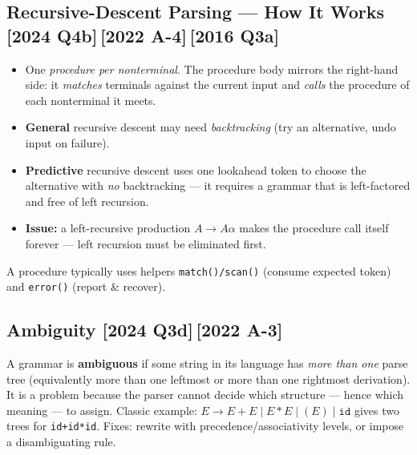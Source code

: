 \documentclass[12pt, a4paper]{article}
\newenvironment{qbox}{\begin{mdframed}[style=qframe]}{\end{mdframed}}
\newcommand{\yr}[1]{{\small\color{accent}\textbf{[#1]}}}
\newcommand{\term}[1]{\textbf{\color{keyblue}#1}}
\begin{document}
\subsection{Recursive-Descent Parsing — How It Works \yr{2024 Q4b}\,\yr{2022 A-4}\,\yr{2016 Q3a}}
\begin{qbox}
\begin{itemize}
\item One \emph{procedure per nonterminal}. The procedure body mirrors the right-hand side: it \emph{matches} terminals
against the current input and \emph{calls} the procedure of each nonterminal it meets.
\item \term{General} recursive descent may need \emph{backtracking} (try an alternative, undo input on failure).
\item \term{Predictive} recursive descent uses one lookahead token to choose the alternative with \emph{no} backtracking
— it requires a grammar that is left-factored and free of left recursion.
\item \textbf{Issue:} a left-recursive production $A\to A\alpha$ makes the procedure call itself forever — left recursion must be eliminated first.
\end{itemize}
A procedure typically uses helpers \texttt{match()/scan()} (consume expected token) and \texttt{error()} (report \& recover).
\end{qbox}

\subsection{Ambiguity \yr{2024 Q3d}\,\yr{2022 A-3}}
\begin{qbox}
A grammar is \term{ambiguous} if some string in its language has \emph{more than one} parse tree (equivalently more than
one leftmost or more than one rightmost derivation). It is a problem because the parser cannot decide which structure —
hence which meaning — to assign. Classic example: \(E\to E+E \mid E*E \mid (E) \mid \texttt{id}\) gives two trees for
\texttt{id+id*id}. Fixes: rewrite with precedence/associativity levels, or impose a disambiguating rule.
\end{qbox}
\end{document}
